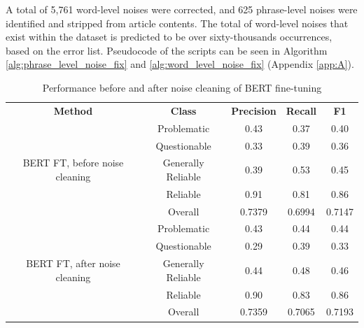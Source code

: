 A total of 5,761 word-level noises were corrected, and 625 phrase-level noises were identified and stripped from article contents. The total of word-level noises that exist within the dataset is predicted to be over sixty-thousands occurrences, based on the error list. Pseudocode of the scripts can be seen in Algorithm \ref{alg:phrase_level_noise_fix} and \ref{alg:word_level_noise_fix} (Appendix \ref{app:A}).


\begin{table}[htbp]
    \centering
    \scriptsize
    \begin{tabular}{| c | c | c | c | c |}
        \hline                            \textbf{Method} & \textbf{Class}     & \textbf{Precision} & \textbf{Recall} & \textbf{F1} \\\cline{1-5}

        \multirow{5}{*}{BERT FT, before noise cleaning}   & Problematic        & 0.43               & 0.37            & 0.40        \\
                                                          & Questionable       & 0.33               & 0.39            & 0.36        \\
                                                          & Generally Reliable & 0.39               & 0.53            & 0.45        \\
                                                          & Reliable           & 0.91               & 0.81            & 0.86        \\\cline{2-5}
                                                          & Overall            & 0.7379             & 0.6994          & 0.7147      \\
        \hline
        \multirow{5}{*}{BERT FT, after noise cleaning}    & Problematic        & 0.43               & 0.44            & 0.44        \\
                                                          & Questionable       & 0.29               & 0.39            & 0.33        \\
                                                          & Generally Reliable & 0.44               & 0.48            & 0.46        \\
                                                          & Reliable           & 0.90               & 0.83            & 0.86        \\\cline{2-5}
                                                          & Overall            & 0.7359             & 0.7065          & 0.7193      \\
        \hline
    \end{tabular}
    \caption{Performance before and after noise cleaning of BERT fine-tuning}
    \label{table:noise_performance_comparison}
\end{table}

